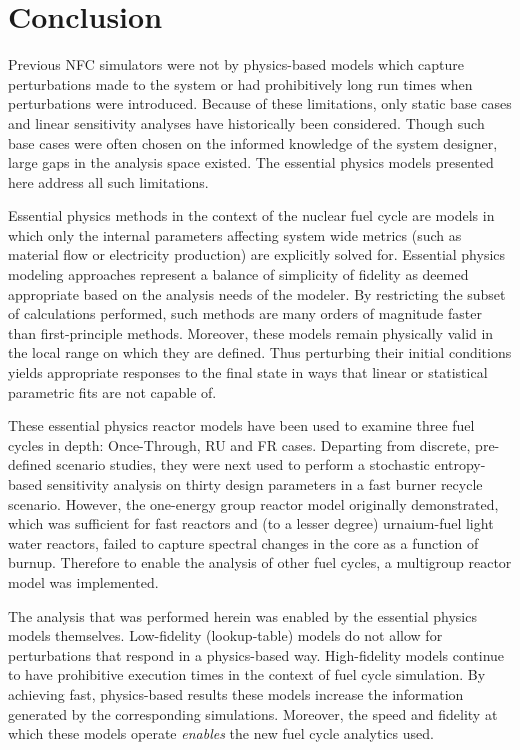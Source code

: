 \chapter{Conclusion}
\label{diss_conclusion}
Previous NFC simulators were not by physics-based models which capture perturbations made to the system
or had prohibitively long run times when perturbations were introduced.  Because of these 
limitations, only static base cases and linear sensitivity analyses have historically been considered.  
Though such base cases were often chosen on the informed knowledge of the system designer, 
large gaps in the analysis space existed.  The essential physics models presented here address all such 
limitations.

Essential physics methods in the context of the nuclear fuel cycle are models 
in which only the internal parameters affecting system wide metrics (such as material flow
or electricity production) are explicitly solved for.  
Essential physics modeling approaches represent a balance of simplicity of fidelity as deemed 
appropriate based on the analysis needs of the modeler.
By restricting the subset of 
calculations performed, such methods are many orders of magnitude faster than first-principle 
methods.  Moreover, these models remain physically valid in the local range on which they are defined.
Thus perturbing their initial conditions yields appropriate responses to the final state
in ways that linear or statistical parametric fits are not capable of.

These essential physics reactor models have been used to examine three fuel cycles 
in depth: Once-Through, RU and FR cases.  
Departing from discrete, pre-defined scenario studies, they were next used to perform 
a stochastic entropy-based sensitivity analysis on thirty design parameters in a fast
burner recycle scenario.  However, the one-energy group reactor model originally demonstrated, 
which was sufficient for fast reactors and (to a lesser degree) urnaium-fuel light 
water reactors,  failed to capture 
spectral changes in the core as a function of burnup.
Therefore to enable the analysis of other fuel cycles, a multigroup reactor model was implemented.  

The analysis that was performed herein was enabled by the essential physics models themselves.
Low-fidelity (lookup-table) models do not allow for perturbations that respond 
in a physics-based way.  High-fidelity models continue to have prohibitive execution times in the 
context of fuel cycle simulation.  By achieving fast, physics-based results these models increase 
the information generated by the corresponding simulations.
Moreover, the speed and fidelity at which these models operate \emph{enables} the 
new fuel cycle analytics used.  

